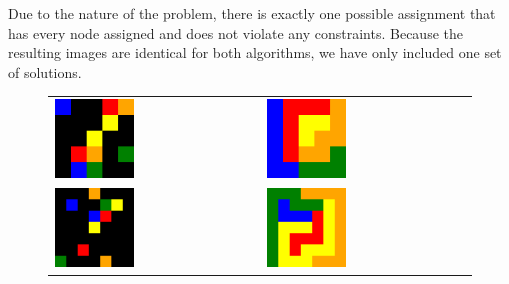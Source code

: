 \documentclass{article}
\begin{document}
    Due to the nature of the problem, there is exactly one possible assignment that has every node assigned and does not violate any constraints. Because the resulting images are identical for both algorithms, we have only included one set of solutions.
    
    \begin{figure}
	\centering
	\begin{tabularx}{\textwidth}{X X}
		\includegraphics[width=0.4\textwidth]{5x5_input.png} &
		\includegraphics[width=0.4\textwidth]{5x5_output.png} \\
		\includegraphics[width=0.4\textwidth]{7x7_input.png} &
		\includegraphics[width=0.4\textwidth]{7x7_output.png} \\

\end{tabularx}
\end{figure}
\end{document}
